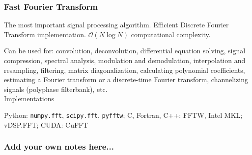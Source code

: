 \documentclass[6pt,landscape,a4paper]{article}
\begin{document}
\begin{multicols*}{5}

\subsubsection*{Fast Fourier Transform}
The most important signal processing algorithm. Efficient Discrete Fourier Transform implementation. $\mathcal{O}(N \log N)$ computational complexity.

Can be used for: convolution, deconvolution, differential equation solving, signal compression, spectral analysis, modulation and demodulation, interpolation and resampling, filtering, matrix diagonalization, calculating polynomial coefficients, estimating a Fourier transform or a discrete-time Fourier transform, channelizing signals (polyphase filterbank), etc.
\\
Implementations

Python: \verb|numpy.fft|, \verb|scipy.fft|, \verb|pyfftw|; C, Fortran, C++: FFTW, Intel MKL; vDSP.FFT; CUDA: CuFFT


\subsubsection*{Add your own notes here...}
\end{multicols*}
\end{document}

